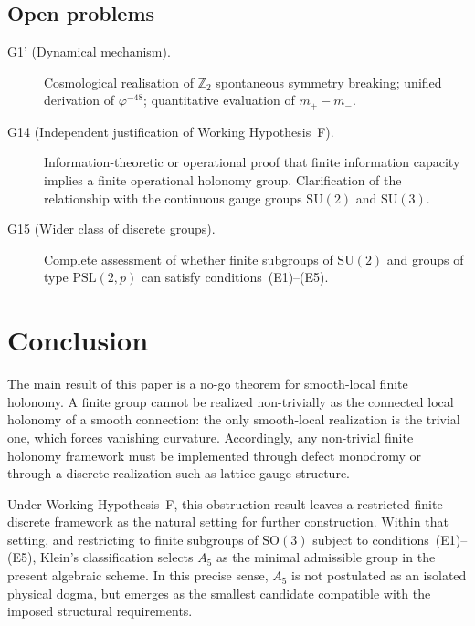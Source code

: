 \documentclass[sn-mathphys-num,Numbered]{sn-jnl}
\theoremstyle{thmstyleone}
\theoremstyle{thmstylethree}
\theoremstyle{thmstyletwo}
\newcommand{\SO}{\mathrm{SO}}
\begin{document}
\subsection{Open problems}
\label{ssec:open-problems}

\begin{description}
  \item[G1' (Dynamical mechanism).]
    Cosmological realisation of $\mathbb{Z}_2$ spontaneous symmetry
    breaking; unified derivation of $\varphi^{-48}$; quantitative
    evaluation of $m_+ - m_-$.

  \item[G14 (Independent justification of Working Hypothesis~F).]
    Information-theoretic or operational proof that finite information
    capacity implies a finite operational holonomy group.  Clarification
    of the relationship with the continuous gauge groups $\mathrm{SU}(2)$
    and $\mathrm{SU}(3)$.

  \item[G15 (Wider class of discrete groups).]
    Complete assessment of whether finite subgroups of $\mathrm{SU}(2)$
    and groups of type $\mathrm{PSL}(2,p)$ can satisfy
    conditions~(E1)--(E5).
\end{description}

\section{Conclusion}
\label{sec:conclusion}

The main result of this paper is a no-go theorem for smooth-local finite
holonomy. A finite group cannot be realized non-trivially as the
connected local holonomy of a smooth connection: the only smooth-local
realization is the trivial one, which forces vanishing curvature.
Accordingly, any non-trivial finite holonomy framework must be
implemented through defect monodromy or through a discrete realization
such as lattice gauge structure.

Under Working Hypothesis~F, this obstruction result leaves a restricted
finite discrete framework as the natural setting for further
construction. Within that setting, and restricting to finite subgroups
of $\SO(3)$ subject to conditions~(E1)--(E5), Klein's classification
selects $A_5$ as the minimal admissible group in the present algebraic
scheme. In this precise sense, $A_5$ is not postulated as an isolated
physical dogma, but emerges as the smallest candidate compatible with
the imposed structural requirements.
\end{document}
